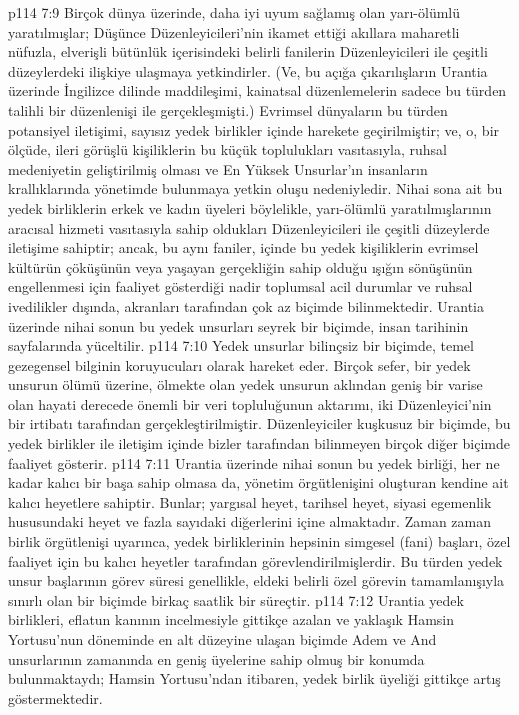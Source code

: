 \vs p114 7:9 Birçok dünya üzerinde, daha iyi uyum sağlamış olan yarı\hyp{}ölümlü yaratılmışlar; Düşünce Düzenleyicileri’nin ikamet ettiği akıllara maharetli nüfuzla, elverişli bütünlük içerisindeki belirli fanilerin Düzenleyicileri ile çeşitli düzeylerdeki ilişkiye ulaşmaya yetkindirler. (Ve, bu açığa çıkarılışların Urantia üzerinde İngilizce dilinde maddileşimi, kainatsal düzenlemelerin sadece bu türden talihli bir düzenlenişi ile gerçekleşmişti.) Evrimsel dünyaların bu türden potansiyel iletişimi, sayısız yedek birlikler içinde harekete geçirilmiştir; ve, o, bir ölçüde, ileri görüşlü kişiliklerin bu küçük toplulukları vasıtasıyla, ruhsal medeniyetin geliştirilmiş olması ve En Yüksek Unsurlar’ın insanların krallıklarında yönetimde bulunmaya yetkin oluşu nedeniyledir. Nihai sona ait bu yedek birliklerin erkek ve kadın üyeleri böylelikle, yarı\hyp{}ölümlü yaratılmışlarının aracısal hizmeti vasıtasıyla sahip oldukları Düzenleyicileri ile çeşitli düzeylerde iletişime sahiptir; ancak, bu aynı faniler, içinde bu yedek kişiliklerin evrimsel kültürün çöküşünün veya yaşayan gerçekliğin sahip olduğu ışığın sönüşünün engellenmesi için faaliyet gösterdiği nadir toplumsal acil durumlar ve ruhsal ivedilikler dışında, akranları tarafından çok az biçimde bilinmektedir. Urantia üzerinde nihai sonun bu yedek unsurları seyrek bir biçimde, insan tarihinin sayfalarında yüceltilir.
\vs p114 7:10 Yedek unsurlar bilinçsiz bir biçimde, temel gezegensel bilginin koruyucuları olarak hareket eder. Birçok sefer, bir yedek unsurun ölümü üzerine, ölmekte olan yedek unsurun aklından geniş bir varise olan hayati derecede önemli bir veri topluluğunun aktarımı, iki Düzenleyici’nin bir irtibatı tarafından gerçekleştirilmiştir. Düzenleyiciler kuşkusuz bir biçimde, bu yedek birlikler ile iletişim içinde bizler tarafından bilinmeyen birçok diğer biçimde faaliyet gösterir.
\vs p114 7:11 Urantia üzerinde nihai sonun bu yedek birliği, her ne kadar kalıcı bir başa sahip olmasa da, yönetim örgütlenişini oluşturan kendine ait kalıcı heyetlere sahiptir. Bunlar; yargısal heyet, tarihsel heyet, siyasi egemenlik hususundaki heyet ve fazla sayıdaki diğerlerini içine almaktadır. Zaman zaman birlik örgütlenişi uyarınca, yedek birliklerinin hepsinin simgesel (fani) başları, özel faaliyet için bu kalıcı heyetler tarafından görevlendirilmişlerdir. Bu türden yedek unsur başlarının görev süresi genellikle, eldeki belirli özel görevin tamamlanışıyla sınırlı olan bir biçimde birkaç saatlik bir süreçtir.
\vs p114 7:12 Urantia yedek birlikleri, eflatun kanının incelmesiyle gittikçe azalan ve yaklaşık Hamsin Yortusu’nun döneminde en alt düzeyine ulaşan biçimde Adem ve And unsurlarının zamanında en geniş üyelerine sahip olmuş bir konumda bulunmaktaydı; Hamsin Yortusu’ndan itibaren, yedek birlik üyeliği gittikçe artış göstermektedir.
